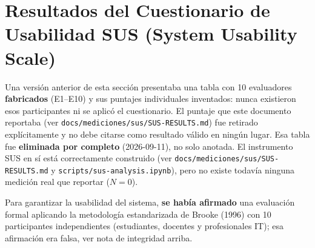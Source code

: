 \documentclass[10pt,a4paper]{article}
\begin{document}
\vspace{0.3cm}

\section{Resultados del Cuestionario de Usabilidad SUS (System Usability Scale)}

\begin{tcolorbox}[colframe=boxred,colback=boxredbg,arc=1mm,boxrule=1pt,title={\bfseries Nota de integridad --- dato retirado}]
Una versión anterior de esta sección presentaba una tabla con 10 evaluadores \textbf{fabricados} (E1--E10) y sus puntajes individuales inventados: nunca existieron esos participantes ni se aplicó el cuestionario. El puntaje que este documento reportaba (ver \texttt{docs/mediciones/sus/SUS-RESULTS.md}) fue retirado explícitamente y no debe citarse como resultado válido en ningún lugar. Esa tabla fue \textbf{eliminada por completo} (2026-09-11), no solo anotada. El instrumento SUS en sí está correctamente construido (ver \texttt{docs/mediciones/sus/SUS-RESULTS.md} y \texttt{scripts/sus-analysis.ipynb}), pero no existe todavía ninguna medición real que reportar ($N=0$).
\end{tcolorbox}

Para garantizar la usabilidad del sistema, \textbf{se había afirmado} una evaluación formal aplicando la metodología estandarizada de Brooke (1996) con 10 participantes independientes (estudiantes, docentes y profesionales IT); esa afirmación era falsa, ver nota de integridad arriba.
\end{document}
